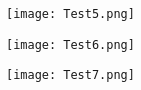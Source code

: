 \begin{figure}[H]
	\centering
	\texttt{[image: Test5.png]}
	\label{fig:Test5}
\end{figure}

\begin{figure}[H]
	\centering
	\texttt{[image: Test6.png]}
	\label{fig:Test6}
\end{figure}

\begin{figure}[H]
	\centering
	\texttt{[image: Test7.png]}
	\label{fig:Test7}
\end{figure}

